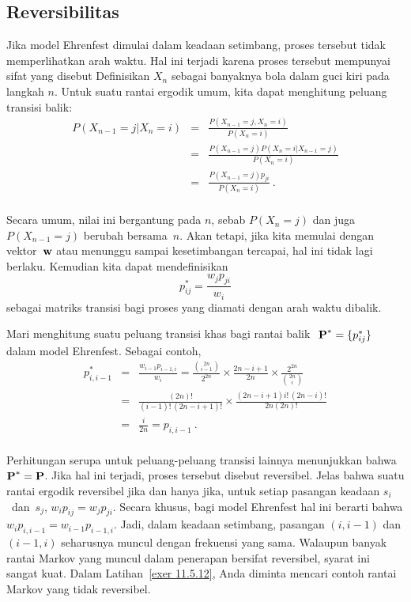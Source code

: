 \subsection*{Reversibilitas}
Jika model Ehrenfest dimulai dalam keadaan setimbang, proses tersebut tidak
memperlihatkan arah waktu. Hal ini terjadi karena proses tersebut mempunyai
sifat yang disebut  Definisikan
$X_n$ sebagai banyaknya bola dalam guci kiri pada langkah $n$. Untuk suatu rantai
ergodik umum, kita dapat menghitung peluang transisi balik:
\begin{eqnarray*}
P(X_{n - 1} = j | X_n = i) &=& \frac{P(X_{n - 1} = j,X_n = i)}{P(X_n = i)} \\
     &=& \frac{P(X_{n - 1} = j) P(X_n = i | X_{n - 1} = j)}{P(X_n = i)} \\
     &=& \frac{P(X_{n - 1} = j) p_{ji}}{P(X_n = i)}\ .\\
\end{eqnarray*}
\par
Secara umum, nilai ini bergantung pada $n$, sebab $P(X_n = j)$ dan juga
$P(X_{n - 1} = j)$ berubah bersama~$n$. Akan tetapi, jika kita memulai dengan
vektor~${\mbox{\bf w}\/}$ atau menunggu sampai kesetimbangan tercapai, hal ini tidak lagi
berlaku. Kemudian kita dapat mendefinisikan
$$
p_{ij}^* = \frac{w_j p_{ji}}{w_i}
$$
sebagai matriks transisi bagi proses yang diamati dengan arah waktu dibalik.
\par
Mari menghitung suatu peluang transisi khas bagi rantai balik $\mat{
P}^* = \{p_{ij}^*\}$ dalam model Ehrenfest. Sebagai contoh,
\begin{eqnarray*}
 p_{i,i - 1}^* &=& \frac{w_{i - 1} p_{i - 1,i}}{w_i} = 
\frac{{2n \choose {i - 1}}}{2^{2n}}
                  \times \frac{2n - i + 1}{2n} \times 
\frac{2^{2n}}{{2n \choose i}}\\
               &=& \frac{(2n)!}{(i - 1)!\,(2n - i + 1)!} \times 
\frac{(2n - i + 1) i!\,
                  (2n - i)!}{2n(2n)!} \\
               &=& \frac{i}{2n} = p_{i,i - 1}\ .\\
\end{eqnarray*}
\par
Perhitungan serupa untuk peluang-peluang transisi lainnya menunjukkan bahwa
${\mbox{\bf P}\/}^* = {\mbox{\bf P}\/}$. Jika hal ini terjadi, proses tersebut disebut \emx
{reversibel.} Jelas bahwa suatu rantai ergodik reversibel jika dan hanya jika,
untuk setiap pasangan keadaan $s_i$~dan~$s_j$,
$w_i p_{ij} = w_j p_{ji}$. Secara khusus, bagi model Ehrenfest hal ini berarti
bahwa $w_i p_{i,i - 1} = w_{i - 1} p_{i - 1,i}$. Jadi, dalam keadaan setimbang,
pasangan $(i, i - 1)$ dan $(i - 1, i)$ seharusnya muncul dengan frekuensi yang
sama. Walaupun banyak rantai Markov yang muncul dalam penerapan bersifat
reversibel, syarat ini sangat kuat. Dalam Latihan~\ref{exer 11.5.12}, Anda
diminta mencari contoh rantai Markov yang tidak reversibel.
 
